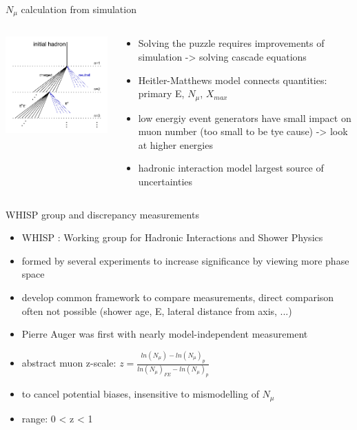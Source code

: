 \documentclass[aspectratio=1610, 9pt]{beamer}
\begin{document}
\begin{frame}{$N_\mu$ calculation from simulation}
  \begin{columns}
    \begin{column}[c]{0.48\textwidth}
      \includegraphics{HM_model.png}
    \end{column}
    \begin{column}[c]{0.48\textwidth}
      \begin{itemize}
        \item Solving the puzzle requires improvements of simulation -> solving cascade equations
        \item Heitler-Matthews model connects quantities: primary E, $N_{\mu}$, $X_{max}$
        \item low energiy event generators have small impact on muon number (too small to be tye cause) -> look at higher energies
        \item hadronic interaction model largest source of uncertainties
      \end{itemize}
    \end{column}
  \end{columns}
\end{frame}

\begin{frame}{WHISP group and discrepancy measurements}
  \begin{itemize}
    \item WHISP : Working group for Hadronic Interactions and Shower Physics
    \item formed by several experiments to increase significance by viewing more phase space
    \item develop common framework to compare measurements, direct comparison often not possible (shower age, E, lateral distance from axis, ...)
    \item Pierre Auger was first with nearly model-independent measurement
    \item abstract muon z-scale: $z = \frac{ln(N_\mu) - ln(N_\mu)_p}{ln(N_\mu)_{FE} - ln(N_\mu)_p}$
    \item to cancel potential biases, insensitive to mismodelling of $N_{\mu}$
    \item range: 0 < z < 1
  \end{itemize}
\end{frame}
\end{document}
